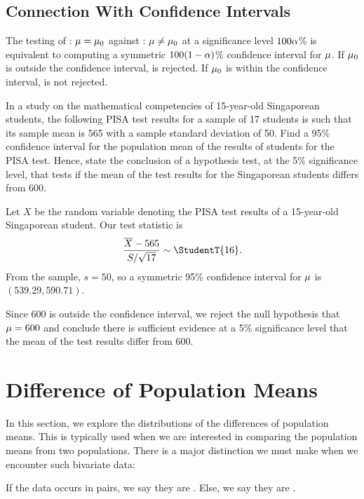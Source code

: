 \subsection{Connection With Confidence Intervals}

The testing of \nullhyp: $\mu = \mu_0$ against \althyp: $\mu \neq \mu_0$ at a significance level $100\alpha$\% is equivalent to computing a symmetric $100(1-\alpha)$\% confidence interval for $\mu$. If $\mu_0$ is outside the confidence interval, \nullhyp{} is rejected. If $\mu_0$ is within the confidence interval, \nullhyp{} is not rejected.

\begin{sample}
    In a study on the mathematical competencies of 15-year-old Singaporean students, the following PISA test results for a sample of 17 students is such that its sample mean is 565 with a sample standard deviation of 50. Find a 95\% confidence interval for the population mean of the results of students for the PISA test. Hence, state the conclusion of a hypothesis test, at the 5\% significance level, that tests if the mean of the test results for the Singaporean students differs from 600.
\end{sample}
\begin{sampans}
    Let $X$ be the random variable denoting the PISA test results of a 15-year-old Singaporean student. Our test statistic is \[\frac{\ol{X} - 565}{S/\sqrt{17}} \sim \StudentT{16}.\] From the sample, $s = 50$, so a symmetric 95\% confidence interval for $\mu$ is $(539.29, 590.71)$.
    
    Since 600 is outside the confidence interval, we reject the null hypothesis that $\mu = 600$ and conclude there is sufficient evidence at a 5\% significance level that the mean of the test results differ from 600.
\end{sampans}

\section{Difference of Population Means}

In this section, we explore the distributions of the differences of population means. This is typically used when we are interested in comparing the population means from two populations. There is a major distinction we must make when we encounter such bivariate data:

\begin{definition}
    If the data occurs in pairs, we say they are . Else, we say they are .
\end{definition}

